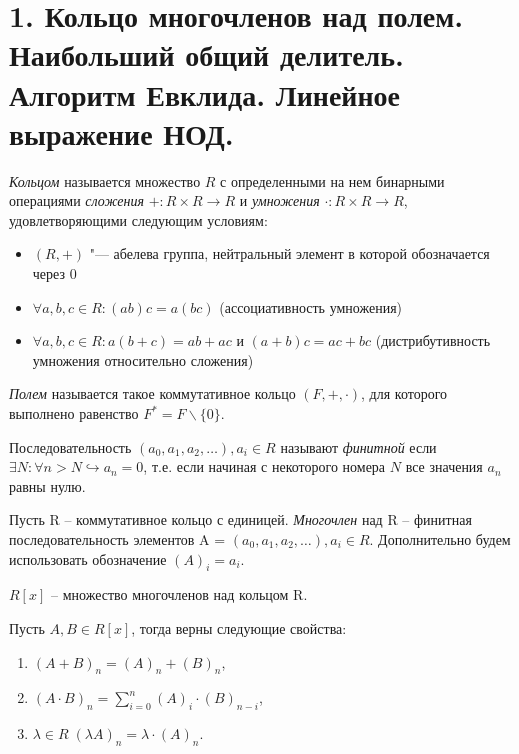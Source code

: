 \section{1. Кольцо многочленов над полем. Наибольший общий делитель. Алгоритм Евклида. Линейное выражение НОД.}

\begin{reminder}
    \textit{Кольцом} называется множество $R$ с определенными на нем бинарными операциями \textit{сложения} $+ : R \times R \to R$ и \textit{умножения} $\cdot: R \times R \rightarrow R$, удовлетворяющими следующим условиям:
    \begin{itemize}
        \item $(R, +)$ "--- абелева группа, нейтральный элемент в которой обозначается через $0$
        \item $\forall a, b, c \in R: (ab)c = a(bc)$ (ассоциативность умножения)
        \item $\forall a, b, c \in R: a(b + c) = ab + ac$ и $(a + b)c = ac + bc$ (дистрибутивность умножения относительно сложения)
    \end{itemize}
\end{reminder}

\begin{reminder}
    \textit{Полем} называется такое коммутативное кольцо $(F, +, \cdot)$, для которого выполнено равенство $F^* = F\backslash\{0\}$.
\end{reminder}

\begin{definition}
    Последовательность $(a_0, a_1, a_2,\ldots), a_i \in R$ называют \textit{финитной} если 
    $\exists N : \forall n>N \hookrightarrow a_n = 0$, т.е. если начиная с некоторого номера $N$ все значения $a_n$ равны нулю.
\end{definition}

\begin{definition}
    Пусть R -- коммутативное кольцо с единицей. \textit{Многочлен} над R -- финитная последовательность элементов A = $(a_0, a_1, a_2,\ldots), a_i \in R$. Дополнительно будем использовать обозначение $(A)_i = a_i$.
\end{definition}

\begin{definition}
    $R[x]$ -- множество многочленов над кольцом R.
\end{definition}

\begin{definition}
    Пусть $A, B \in R[x]$, тогда верны следующие свойства:
    \begin{enumerate}
        \item $(A + B)_n = (A)_n + (B)_n$,
        \item $(A \cdot B)_n = \displaystyle\sum_{i = 0}^{n}(A)_i \cdot (B)_{n-i}$,
        \item $\lambda \in R \; (\lambda A)_n = \lambda \cdot (A)_n$.
    \end{enumerate}
\end{definition}

